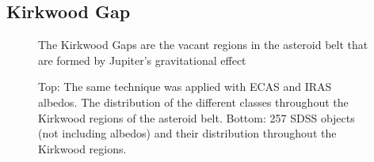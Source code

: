 \documentclass[thesis]{RyanPoster}
\begin{document}
\begin{poster}
\section{Kirkwood Gap}
\begin{figure}
\begin{center}
\caption{The Kirkwood Gaps are the vacant regions in the asteroid belt that are formed by Jupiter's gravitational effect }%
\end{center}
\end{figure}

\begin{figure}
\begin{center}
\caption{Top: The same technique was applied with ECAS and IRAS albedos.  The distribution of the different classes throughout the Kirkwood regions of the asteroid belt.  Bottom: 257 SDSS objects (not including albedos) and their distribution throughout the Kirkwood regions. }%
\end{center}
\end{figure}


\end{poster}
\end{document}
